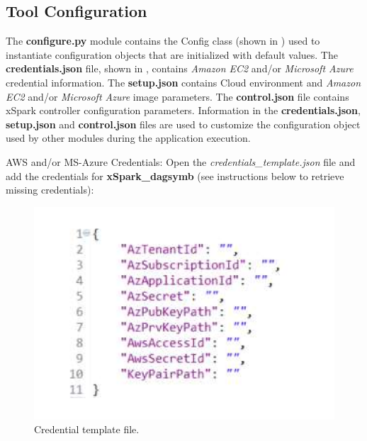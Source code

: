 \hypertarget{tool-configuration}{%
\subsection{Tool Configuration}\label{tool-configuration}}

The \textbf{configure.py} module contains the Config class (shown in ) used to instantiate configuration objects that are initialized with default values. The \textbf{credentials.json} file, shown in , contains \emph{Amazon EC2}
and/or \emph{Microsoft Azure} credential information. The
\textbf{setup.json} contains Cloud environment and \emph{Amazon EC2}
and/or \emph{Microsoft Azure} image parameters. The
\textbf{control.json} file contains xSpark controller configuration
parameters. Information in the \textbf{credentials.json},
\textbf{setup.json} and \textbf{control.json} files are used to
customize the configuration object used by other modules during the
application execution.

AWS and/or MS-Azure Credentials: Open the
\emph{credentials\_template.json} file and add the credentials for \textbf{xSpark\_dagsymb} (see instructions below to retrieve missing
credentials):
\begin{figure}[thbp]
	\centering
	\includegraphics[width=\columnwidth]{images/xspark_dagsymb_credentials_template.pdf}
	\caption{Credential template file.}
	\label{fig:xspark_dagsymb_credentials_template}
\end{figure}
